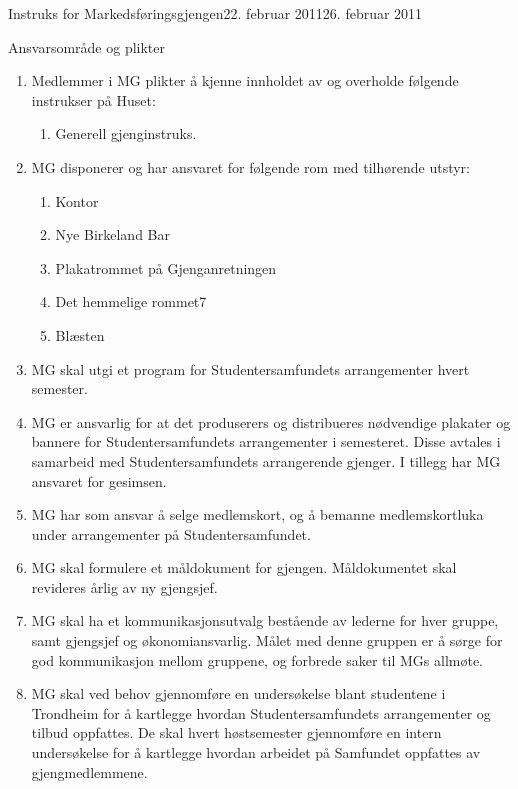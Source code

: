 \begin{instruks}{Instruks for Markedsføringsgjengen}{22. februar 2011}{26. februar 2011 }
    \begin{instruksledd}{Ansvarsområde og plikter}
        \begin{enumerate}   
            \item  Medlemmer i MG plikter å kjenne innholdet av og overholde følgende instrukser på
                Huset:
                \begin{enumerate}
                    \item Generell gjenginstruks.
                \end{enumerate}
            \item MG disponerer og har ansvaret for følgende rom med tilhørende utstyr:
                \begin{enumerate}
                    \item Kontor
                    \item Nye Birkeland Bar
                    \item Plakatrommet på Gjenganretningen
                    \item Det hemmelige rommet7
                    \item Blæsten
                \end{enumerate}
            \item MG skal utgi et program for
                Studentersamfundets arrangementer hvert semester.
            \item MG er ansvarlig for at det
                produserers og distribueres nødvendige plakater og bannere for
                Studentersamfundets
                arrangementer i semesteret. Disse avtales i samarbeid med Studentersamfundets
                arrangerende
                gjenger. I tillegg har MG ansvaret for gesimsen.
            \item MG har som ansvar å selge medlemskort, og å
                bemanne medlemskortluka under arrangementer på Studentersamfundet.
            \item MG skal formulere et måldokument for
                gjengen. Måldokumentet skal revideres årlig av ny gjengsjef.
            \item MG skal ha et kommunikasjonsutvalg
                bestående av lederne for hver gruppe, samt gjengsjef og
                økonomiansvarlig. Målet med denne gruppen er å sørge for god kommunikasjon mellom gruppene, og
                forbrede saker til MGs allmøte.
            \item MG skal ved behov gjennomføre en
                undersøkelse blant studentene i Trondheim for å kartlegge
                hvordan Studentersamfundets arrangementer og tilbud oppfattes. De skal hvert høstsemester
                gjennomføre en
                intern undersøkelse for å kartlegge hvordan arbeidet på Samfundet oppfattes av gjengmedlemmene.
        \end{enumerate}
    \end{instruksledd}


\end{instruks}
